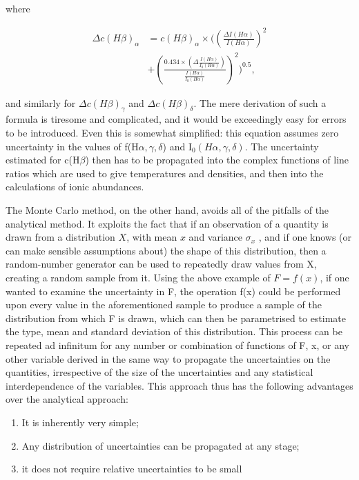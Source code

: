 \documentclass[useAMS,usenatbib]{mn2e}
\begin{document}
where

\begin{eqnarray}
\Delta c(H\beta)_\alpha &= c(H\beta)_\alpha \times \bigg(\left(\frac{\Delta I(H\alpha)}{I(H\alpha)}\right)^2 \\
&+ \left(\frac{0.434 \times (\Delta\frac{I(H\alpha)}{I_0(H\alpha)})}{\frac{I(H\alpha)}{I_0(H\alpha)}}\right)^2\bigg)^{0.5},
\end{eqnarray}

and similarly for $\Delta c(H\beta)_\gamma$ and $\Delta c(H\beta)_\delta$.  The mere derivation of such a formula is tiresome and complicated, and it would be exceedingly easy for errors to be introduced.  Even this is somewhat simplified: this equation assumes zero uncertainty in the values of f(H$\alpha, \gamma, \delta$) and I$_0(H\alpha, \gamma, \delta)$.  The uncertainty estimated for c(H$\beta$) then has to be propagated into the complex functions of line ratios which are used to give temperatures and densities, and then into the calculations of ionic abundances.

The Monte Carlo method, on the other hand, avoids all of the pitfalls of the analytical method.  It exploits the fact that if an observation of a quantity is drawn from a distribution $X$, with mean $x$ and variance $\sigma_x$ , and if one knows (or can make sensible assumptions about) the shape of this distribution, then a random-number generator can be used to repeatedly draw values from X, creating a random sample from it. Using the above example of $F = f (x)$, if one wanted to examine the uncertainty in F, the operation f(x) could be performed upon every value in the aforementioned sample to produce a sample of the distribution from which F is drawn, which can then be parametrised to estimate the type, mean and standard deviation of this distribution. This process can be repeated ad infinitum for any number or combination of functions of F, x, or any other variable derived in the same way to propagate the uncertainties on the quantities, irrespective of the size of the uncertainties and any statistical interdependence of the variables.  This approach thus has the following advantages over the analytical approach:

\begin{enumerate}
  \item It is inherently very simple;
  \item Any distribution of uncertainties can be propagated at any stage;
  \item it does not require relative uncertainties to be small
\end{enumerate}
\end{document}
